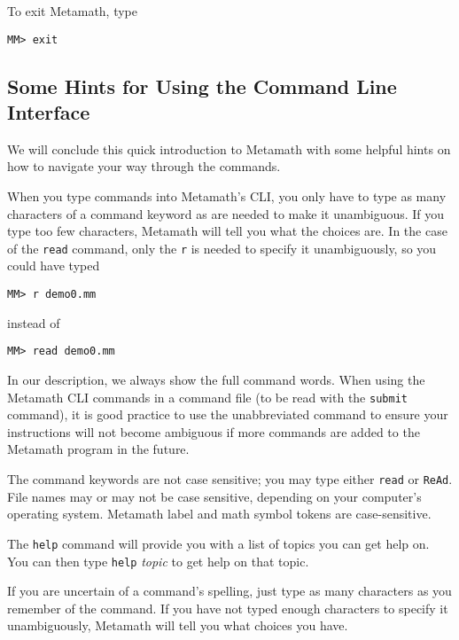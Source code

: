 To exit Metamath, type
\begin{verbatim}
MM> exit
\end{verbatim}

\subsection{Some Hints for Using the Command Line Interface}

We will conclude this quick introduction to Metamath with some
helpful hints on how to navigate your way through the commands.

When you type commands into Metamath's CLI, you only have to type as many
characters of a command keyword as are needed to make
it unambiguous.  If you type too few characters, Metamath will tell you what
the choices are.  In the case of the \texttt{read} command, only the \texttt{r} is
needed to specify it unambiguously, so you could have typed
\begin{verbatim}
MM> r demo0.mm
\end{verbatim}
instead of
\begin{verbatim}
MM> read demo0.mm
\end{verbatim}
In our description, we always show the full command words.  When using the
Metamath CLI commands in a command file (to be read with the \texttt{submit}
command), it is good practice to use
the unabbreviated command to ensure your instructions will not become ambiguous
if more commands are added to the Metamath program in the future.

The command keywords are not case sensitive; you may type either \texttt{read} or
\texttt{ReAd}.  File names may or may not be case sensitive, depending on your
computer's operating system.  Metamath label and math
symbol tokens are case-sensitive.

The \texttt{help} command will provide you
with a list of topics you can get help on.  You can then type
\texttt{help} {\em topic} to get help on that topic.

If you are uncertain of a command's spelling, just type as many characters
as you remember of the command.  If you have not typed enough characters to
specify it unambiguously, Metamath will tell you what choices you have.

